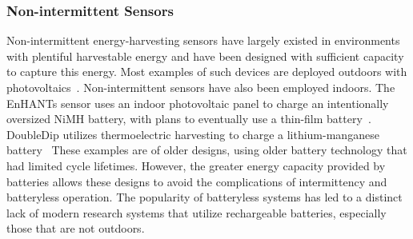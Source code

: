 \subsubsection{Non-intermittent Sensors}
\label{sec:related:nonintermittent}
Non-intermittent energy-harvesting sensors
have largely existed in environments with plentiful harvestable energy
and have been designed with sufficient capacity to capture this energy.
Most examples of such devices are deployed outdoors with photovoltaics~\cite{jiang2005perpetual, kansal2007power, corke2007long, lin2005heliomote, adkins2018signpost}.
Non-intermittent sensors have also been employed indoors.
The EnHANTs sensor uses an indoor photovoltaic panel to charge an intentionally oversized NiMH
battery, with plans to eventually use a thin-film battery~\cite{margolies2015energy}.
DoubleDip utilizes thermoelectric harvesting to charge a lithium-manganese battery~\cite{martin2012doubledip}
These examples are of older designs, using older battery technology that had limited cycle lifetimes. However, the greater energy capacity provided by batteries allows these designs to avoid the complications of intermittency and batteryless operation.
The popularity of batteryless systems has led to a distinct lack of modern research systems that utilize rechargeable batteries, especially those that are not outdoors.



